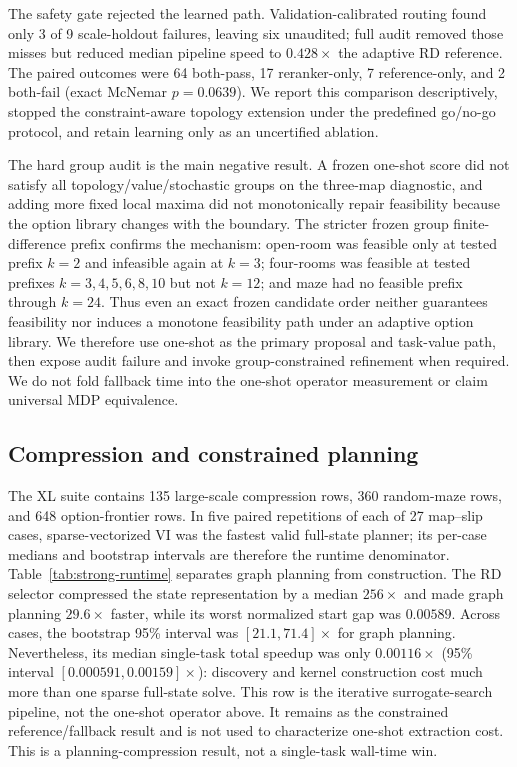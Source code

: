 \documentclass[10pt]{article}
\begin{document}
The safety gate rejected the learned path. Validation-calibrated routing found
only 3 of 9 scale-holdout failures, leaving six unaudited; full audit removed
those misses but reduced median pipeline speed to $0.428\times$ the adaptive RD
reference. The paired outcomes were 64 both-pass, 17 reranker-only, 7
reference-only, and 2 both-fail (exact McNemar $p=0.0639$). We report this
comparison descriptively, stopped the constraint-aware topology extension under
the predefined go/no-go protocol, and retain learning only as an uncertified
ablation.

The hard group audit is the main negative result. A frozen one-shot score did
not satisfy all topology/value/stochastic groups on the three-map diagnostic,
and adding more fixed local maxima did not monotonically repair feasibility
because the option library changes with the boundary. The stricter frozen
group finite-difference prefix confirms the mechanism:
open-room was feasible only at tested prefix $k=2$ and infeasible again at
$k=3$; four-rooms was feasible at tested prefixes $k=3,4,5,6,8,10$ but not
$k=12$; and maze had no feasible prefix through $k=24$. Thus even an exact
frozen candidate order neither guarantees feasibility nor induces a monotone
feasibility path under an adaptive option library.
We therefore use
one-shot as the primary proposal and task-value path, then expose audit failure
and invoke group-constrained refinement when required. We do not fold fallback
time into the one-shot operator measurement or claim universal MDP equivalence.

\subsection{Compression and constrained planning}
The XL suite contains 135 large-scale compression rows, 360 random-maze rows,
and 648 option-frontier rows. In five paired repetitions of each of 27
map--slip cases, sparse-vectorized VI was the fastest valid full-state planner;
its per-case medians and bootstrap intervals are therefore the runtime
denominator. Table~\ref{tab:strong-runtime} separates graph planning from
construction. The RD selector compressed the state representation by a median
$256\times$ and made graph planning $29.6\times$ faster, while its worst
normalized start gap was $0.00589$. Across cases, the bootstrap 95\% interval
was $[21.1,71.4]\times$ for graph planning. Nevertheless, its median
single-task total speedup was only $0.00116\times$ (95\% interval
$[0.000591,0.00159]\times$): discovery and kernel construction cost much more
than one sparse full-state solve. This row is the iterative surrogate-search
pipeline, not the one-shot operator above. It remains as the constrained
reference/fallback result and is not used to characterize one-shot extraction
cost. This is a planning-compression result, not a single-task wall-time win.
\end{document}
